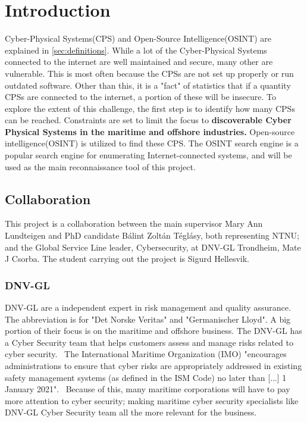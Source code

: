 \section{Introduction} \label{sec:intro}
Cyber-Physical Systems(CPS) and Open-Source Intelligence(OSINT) are explained in \cref{sec:definitions}. While a lot of the Cyber-Physical Systems connected to the internet are well maintained and secure, many other are vulnerable. This is most often because the CPSs are not set up properly or run outdated software. Other than this, it is a "fact" of statistics that if a quantity CPSs are connected to the internet, a portion of these will be insecure. To explore the extent of this challenge, the first step is to identify how many CPSs can be reached. Constraints are set to limit the focus to \textbf{discoverable Cyber Physical Systems in the maritime and offshore industries.}
Open-source intelligence(OSINT) is utilized to find these CPS. The OSINT search engine \href{https://shodan.io}{\color{blue}{Shodan}} is a popular search engine for enumerating Internet-connected systems, and will be used as the main reconnaissance tool of this project.

\subsection{Collaboration}\label{sec:collaboration}
This project is a collaboration between the main supervisor Mary Ann Lundteigen and PhD candidate Bálint Zoltán Téglásy, both representing NTNU; and the Global Service Line leader, Cybersecurity, at DNV-GL Trondheim,  Mate J Csorba. The student carrying out the project is Sigurd Hellesvik.

\subsubsection{DNV-GL}\label{sec:dnvgl}
DNV-GL are a independent expert in risk management and quality assurance. The abbreviation is for "Det Norske Veritas" and "Germanischer Lloyd". A big portion of their focus is on the maritime and offshore business. The DNV-GL has a Cyber Security team that helps customers assess and manage risks related to cyber security.~\cite{DNVGL_cybersec}  The International Maritime Organization (IMO) "encourages administrations to ensure that cyber risks are appropriately addressed in existing safety management systems (as defined in the ISM Code) no later than [...] 1 January 2021".~\cite{IMO_2021} Because of this, many maritime corporations will have to pay more attention to cyber security; making maritime cyber security specialists like DNV-GL Cyber Security team all the more relevant for the business. 


